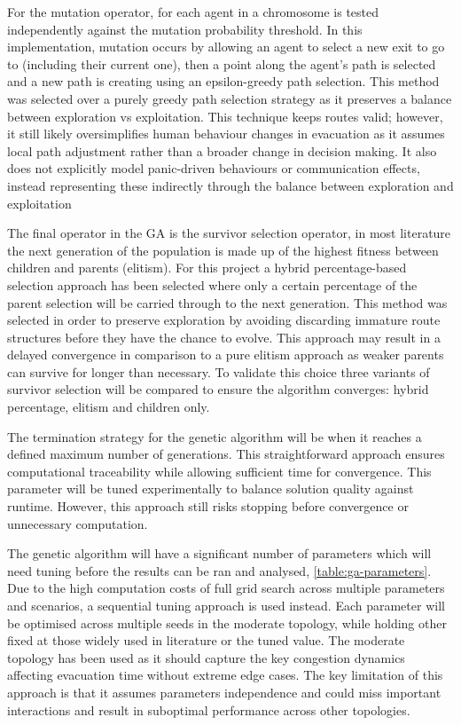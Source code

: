 \documentclass[12pt,a4paper]{report}
\begin{document}
For the mutation operator, for each agent in a chromosome is tested independently against the mutation probability threshold. In this implementation, mutation occurs by allowing an agent to select a new exit to go to (including their current one), then a point along the agent’s path is selected and a new path is creating using an epsilon-greedy path selection. This method was selected over a purely greedy path selection strategy as it preserves a balance between exploration vs exploitation. This technique keeps routes valid; however, it still likely oversimplifies human behaviour changes in evacuation as it assumes local path adjustment rather than a broader change in decision making. It also does not explicitly model panic-driven behaviours or communication effects, instead representing these indirectly through the balance between exploration and exploitation

The final operator in the GA is the survivor selection operator, in most literature the next generation of the population is made up of the highest fitness between children and parents (elitism). For this project a hybrid percentage-based selection approach has been selected where only a certain percentage of the parent selection will be carried through to the next generation. This method was selected in order to preserve exploration by avoiding discarding immature route structures before they have the chance to evolve. This approach may result in a delayed convergence in comparison to a pure elitism approach as weaker parents can survive for longer than necessary. To validate this choice three variants of survivor selection will be compared to ensure the algorithm converges: hybrid percentage, elitism and children only.

The termination strategy for the genetic algorithm will be when it reaches a defined maximum number of generations. This straightforward approach ensures computational traceability while allowing sufficient time for convergence. This parameter will be tuned experimentally to balance solution quality against runtime. However, this approach still risks stopping before convergence or unnecessary computation.

The genetic algorithm will have a significant number of parameters which will need tuning before the results can be ran and analysed, \autoref{table:ga-parameters}. Due to the high computation costs of full grid search across multiple parameters and scenarios, a sequential tuning approach is used instead. Each parameter will be optimised across multiple seeds in the moderate topology, while holding other fixed at those widely used in literature or the tuned value. The moderate topology has been used as it should capture the key congestion dynamics affecting evacuation time without extreme edge cases. The key limitation of this approach is that it assumes parameters independence and could miss important interactions and result in suboptimal performance across other topologies.
\end{document}
